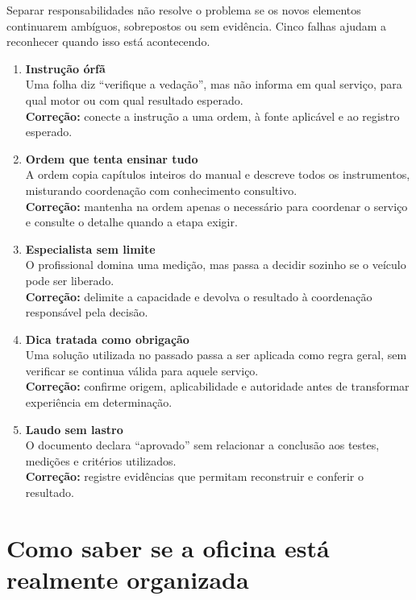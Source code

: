 \documentclass[
  10pt,
  a4paper,
  oneside]{book}
\begin{document}
Separar responsabilidades não resolve o problema se os novos elementos
continuarem ambíguos, sobrepostos ou sem evidência. Cinco falhas ajudam
a reconhecer quando isso está acontecendo.

\begin{enumerate}
\def\labelenumi{\arabic{enumi}.}
\item
  \textbf{Instrução órfã}\\
  Uma folha diz ``verifique a vedação'', mas não informa em qual
  serviço, para qual motor ou com qual resultado esperado.\\
  \textbf{Correção:} conecte a instrução a uma ordem, à fonte aplicável
  e ao registro esperado.
\item
  \textbf{Ordem que tenta ensinar tudo}\\
  A ordem copia capítulos inteiros do manual e descreve todos os
  instrumentos, misturando coordenação com conhecimento consultivo.\\
  \textbf{Correção:} mantenha na ordem apenas o necessário para
  coordenar o serviço e consulte o detalhe quando a etapa exigir.
\item
  \textbf{Especialista sem limite}\\
  O profissional domina uma medição, mas passa a decidir sozinho se o
  veículo pode ser liberado.\\
  \textbf{Correção:} delimite a capacidade e devolva o resultado à
  coordenação responsável pela decisão.
\item
  \textbf{Dica tratada como obrigação}\\
  Uma solução utilizada no passado passa a ser aplicada como regra
  geral, sem verificar se continua válida para aquele serviço.\\
  \textbf{Correção:} confirme origem, aplicabilidade e autoridade antes
  de transformar experiência em determinação.
\item
  \textbf{Laudo sem lastro}\\
  O documento declara ``aprovado'' sem relacionar a conclusão aos
  testes, medições e critérios utilizados.\\
  \textbf{Correção:} registre evidências que permitam reconstruir e
  conferir o resultado.
\end{enumerate}

\hypertarget{como-saber-se-a-oficina-estuxe1-realmente-organizada}{%
\section{Como saber se a oficina está realmente
organizada}\label{como-saber-se-a-oficina-estuxe1-realmente-organizada}}
\end{document}
